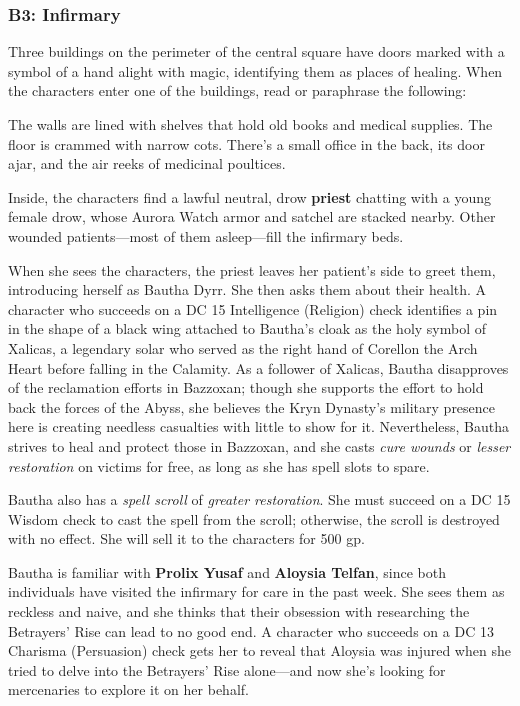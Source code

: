 \documentclass[10pt,a4paper,twoside,fancy,bg=print,twocolumn,openany,nodeprecatedcode]{dndbook}
\begin{document}
\subsubsection{B3: Infirmary}
Three buildings on the perimeter of the central square have doors marked with a symbol of a hand alight with magic, identifying them as places of healing. When the characters enter one of the buildings, read or paraphrase the following:

\begin{DndReadAloud}{}
The walls are lined with shelves that hold old books and medical supplies. The floor is crammed with narrow cots. There's a small office in the back, its door ajar, and the air reeks of medicinal poultices.

\end{DndReadAloud}

Inside, the characters find a lawful neutral, drow \textbf{priest} chatting with a young female drow, whose Aurora Watch armor and satchel are stacked nearby. Other wounded patients—most of them asleep—fill the infirmary beds.

When she sees the characters, the priest leaves her patient's side to greet them, introducing herself as Bautha Dyrr. She then asks them about their health. A character who succeeds on a DC 15 Intelligence (Religion) check identifies a pin in the shape of a black wing attached to Bautha's cloak as the holy symbol of Xalicas, a legendary solar who served as the right hand of Corellon the Arch Heart before falling in the Calamity. As a follower of Xalicas, Bautha disapproves of the reclamation efforts in Bazzoxan; though she supports the effort to hold back the forces of the Abyss, she believes the Kryn Dynasty's military presence here is creating needless casualties with little to show for it. Nevertheless, Bautha strives to heal and protect those in Bazzoxan, and she casts \textit{cure wounds} or \textit{lesser restoration} on victims for free, as long as she has spell slots to spare.

Bautha also has a \textit{spell scroll} of \textit{greater restoration}. She must succeed on a DC 15 Wisdom check to cast the spell from the scroll; otherwise, the scroll is destroyed with no effect. She will sell it to the characters for 500 gp.

Bautha is familiar with \textbf{Prolix Yusaf} and \textbf{Aloysia Telfan}, since both individuals have visited the infirmary for care in the past week. She sees them as reckless and naive, and she thinks that their obsession with researching the Betrayers' Rise can lead to no good end. A character who succeeds on a DC 13 Charisma (Persuasion) check gets her to reveal that Aloysia was injured when she tried to delve into the Betrayers' Rise alone—and now she's looking for mercenaries to explore it on her behalf.
\end{document}
